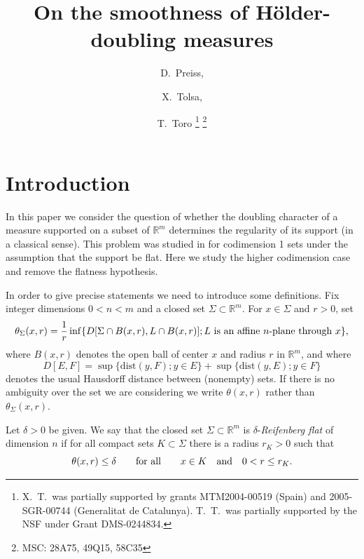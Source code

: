 \documentclass[12pt,leqno]{article}
\newcommand{\RR}{\mathbb{R}}
\newcommand{\dist}{\mathrm{dist}}
\theoremstyle{plain}
\numberwithin{equation}{section}
\begin{document}
\title{On the smoothness of H\"older-doubling measures}
\author{D.\ Preiss,\and  X.\ Tolsa,
\and T.\ Toro
\thanks{X.\ T.\ was partially supported by grants MTM2004-00519 (Spain) and 2005-SGR-00744 (Generalitat
de Catalunya). T.\ T.\ was partially supported by the NSF
under Grant DMS-0244834.}
\thanks{MSC: 28A75, 49Q15, 58C35}}
\date{}
\maketitle


\section{Introduction}

In this paper we consider the question of whether the doubling character of a
measure supported on a subset of $\RR^m$ determines the regularity of
its support (in a classical sense). This problem was studied in
\cite{DKT} for codimension 1 sets under the assumption that the support
be flat. Here we study the higher codimension case and remove the flatness
hypothesis.



In order to give precise statements we need to introduce some definitions.
Fix integer dimensions $0<n<m$ and a closed set $\Sigma\subset\RR^m$. For
$x\in\Sigma$ and $r>0$, set
\begin{equation}\label{eqn:1.2}
\theta_{\Sigma}(x,r) = \frac{1}{r}\inf\{D[\Sigma\cap B(x,r), L\cap B(x,r)];
L\hbox{ is an affine }n\hbox{-plane through }x\},
\end{equation}
where $B(x,r)$ denotes the open ball of center $x$ and radius $r$ in $\RR^m$,
and where
\begin{equation}\label{eqn:1.3}
D[E,F]  =  \sup\{\dist(y,F); y\in E\}
+ \sup\{\dist(y,E); y\in F\}
\end{equation}
denotes the usual Hausdorff distance between (nonempty) sets. If there is no
ambiguity over the set we are considering we write $\theta(x,r)$  rather than
$\theta_{\Sigma}(x,r)$.


\begin{defn}\label{defn:1.4}
Let $\delta>0$ be given. We say that the closed set $\Sigma\subset\RR^m$ is
$\delta$-\emph{Reifenberg flat} of dimension $n$ if for all compact sets
$K\subset\Sigma$ there is a radius $r_K>0$ such that
\begin{equation}\label{eqn:1.5}
\theta(x,r)\le\delta\qquad\hbox{for all}\qquad x\in K\quad\hbox{and}\quad
0<r\le r_K.
\end{equation}
\end{defn}
\end{document}

